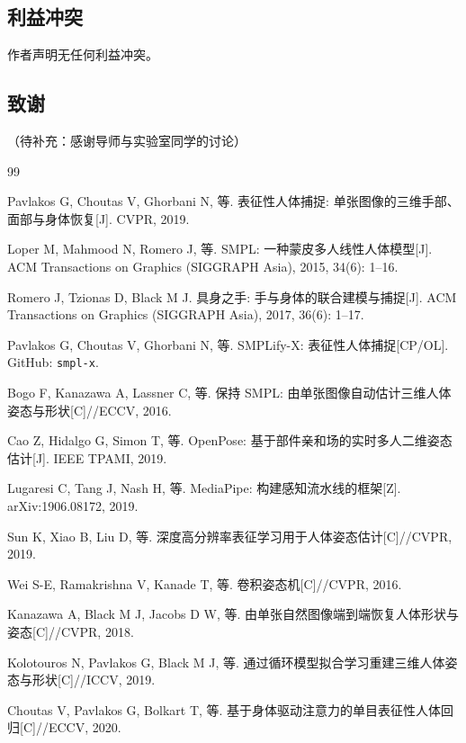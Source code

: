 \documentclass[a4paper,11pt]{article}
\begin{document}
\subsection*{利益冲突}
作者声明无任何利益冲突。

\subsection*{致谢}
（待补充：感谢导师与实验室同学的讨论）

\begin{thebibliography}{99}

Pavlakos G, Choutas V, Ghorbani N, 等. 表征性人体捕捉: 单张图像的三维手部、面部与身体恢复[J]. CVPR, 2019.

Loper M, Mahmood N, Romero J, 等. SMPL: 一种蒙皮多人线性人体模型[J]. ACM Transactions on Graphics (SIGGRAPH Asia), 2015, 34(6): 1--16.

Romero J, Tzionas D, Black M J. 具身之手: 手与身体的联合建模与捕捉[J]. ACM Transactions on Graphics (SIGGRAPH Asia), 2017, 36(6): 1--17.

Pavlakos G, Choutas V, Ghorbani N, 等. SMPLify-X: 表征性人体捕捉[CP/OL]. GitHub: \texttt{smpl-x}.

Bogo F, Kanazawa A, Lassner C, 等. 保持 SMPL: 由单张图像自动估计三维人体姿态与形状[C]//ECCV, 2016.

Cao Z, Hidalgo G, Simon T, 等. OpenPose: 基于部件亲和场的实时多人二维姿态估计[J]. IEEE TPAMI, 2019.

Lugaresi C, Tang J, Nash H, 等. MediaPipe: 构建感知流水线的框架[Z]. arXiv:1906.08172, 2019.

Sun K, Xiao B, Liu D, 等. 深度高分辨率表征学习用于人体姿态估计[C]//CVPR, 2019.

Wei S-E, Ramakrishna V, Kanade T, 等. 卷积姿态机[C]//CVPR, 2016.

Kanazawa A, Black M J, Jacobs D W, 等. 由单张自然图像端到端恢复人体形状与姿态[C]//CVPR, 2018.

Kolotouros N, Pavlakos G, Black M J, 等. 通过循环模型拟合学习重建三维人体姿态与形状[C]//ICCV, 2019.

Choutas V, Pavlakos G, Bolkart T, 等. 基于身体驱动注意力的单目表征性人体回归[C]//ECCV, 2020.


\end{thebibliography}
\end{document}
